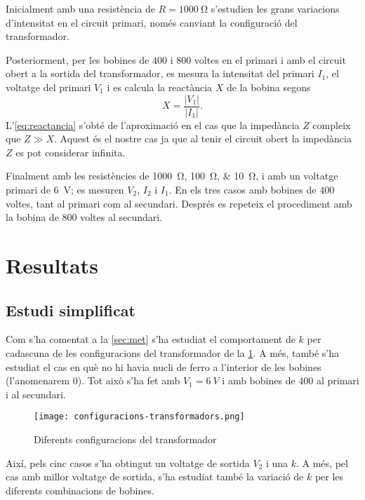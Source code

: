 Inicialment amb una resistència de $R= \SI{1000}{\ohm}$ s'estudien les grans variacions d'intensitat en el circuit primari, només canviant la configuració del transformador. 

Posteriorment, per les bobines de $400$ i $800$ voltes en el primari i amb el circuit obert a la sortida del transformador, es mesura  la intensitat del primari $I_1$, el voltatge del primari $V_1$ i es calcula la reactància $X$ de la bobina segons
\begin{equation}\label{eq:reactancia}
  X=\frac{|V_1|}{|I_1|}.
\end{equation}
L'\cref{eq:reactancia} s'obté de l'aproximació en el cas que la impedància $Z$ compleix que $Z \gg X$. Aquest és el nostre cas ja que al tenir el circuit obert la impedància $Z$ es pot considerar infinita. 

Finalment amb les resistències de \SIlist{1000;100;10}{\ohm}, i amb un voltatge primari de \SI{6}{V}; es mesuren $V_2$, $I_2$ i $I_1$. En els tres casos amb bobines de $400$ voltes, tant al primari com al secundari. Després es repeteix el procediment amb la bobina de $800$ voltes al secundari.

\section{Resultats}
\subsection{Estudi simplificat}
Com s'ha comentat a la \cref{sec:met} s'ha estudiat el comportament de $k$ per cadascuna de les configuracions del transformador de la \cref{fig:configuracions}.
A més, també s'ha estudiat el cas en què no hi havia nucli de ferro a l'interior de les bobines (l'anomenarem $0$). Tot això s'ha fet amb $V_1=\SI{6}{V}$ i amb bobines de $400$ al primari i al secundari.

\begin{figure}[htb]
  \centering \small \sffamily
  \texttt{[image: configuracions-transformadors.png]}
  \caption{Diferents configuracions del transformador}
  \label{fig:configuracions}
\end{figure}

Així, pels cinc casos s'ha obtingut un voltatge de sortida $V_2$ i una $k$. A més, pel cas amb millor voltatge de sortida, s'ha estudiat també la variació de $k$ per les diferents combinacions de bobines.

